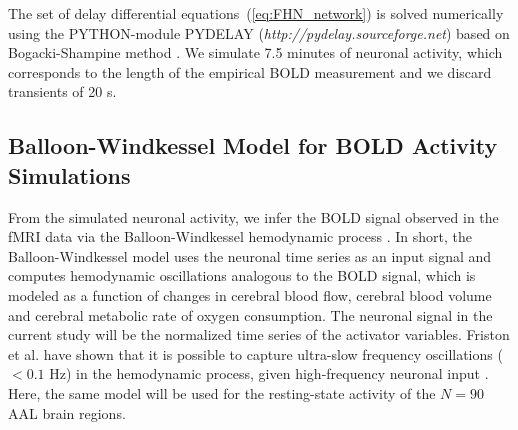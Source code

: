 \documentclass[fleqn,10pt]{wlpeerj}
\begin{document}
The  set of delay differential equations~(\ref{eq:FHN_network}) is solved numerically using the \textsc{PYTHON}-module
\textsc{PYDELAY} (\textit{http://pydelay.sourceforge.net}) based on Bogacki-Shampine method \citep{BOG89,
FLU09a}. We simulate 7.5 minutes of neuronal activity, which corresponds to the length of the empirical BOLD
measurement and we discard transients of 20 s.

\subsection*{Balloon-Windkessel Model for BOLD Activity Simulations} 
From the simulated neuronal activity, we infer the BOLD signal observed in the fMRI data via the
Balloon-Windkessel hemodynamic process
\citep{FRI00}.
In short, the Balloon-Windkessel model uses the neuronal time series as an input signal  \citep{SET12}and computes
hemodynamic oscillations analogous to the BOLD signal, which is modeled as a function of changes in cerebral blood flow,
cerebral blood volume and cerebral metabolic rate of oxygen consumption. 
The neuronal signal in the current study will be the normalized time series of the activator variables.
Friston et al. have shown that it is possible to capture ultra-slow frequency oscillations ($<0.1$ Hz) in the
hemodynamic process, given high-frequency neuronal input \citep{FRI00}. Here, the same
model will be used for the  resting-state activity 
of the $N=90$ AAL brain regions.
\end{document}
